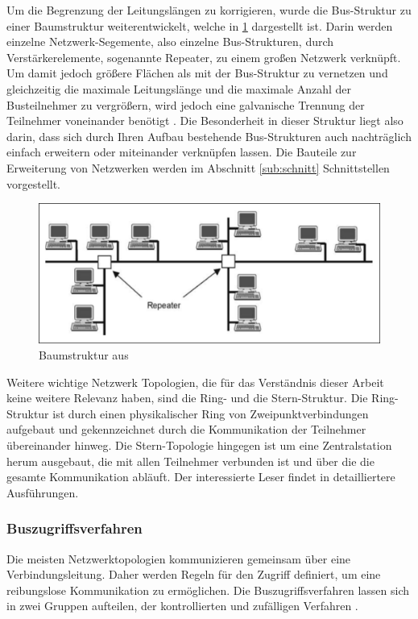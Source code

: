 Um die Begrenzung der Leitungslängen zu korrigieren, wurde die Bus-Struktur zu einer Baumstruktur weiterentwickelt, welche in \ref{fig:baum_struktur} dargestellt ist. Darin werden einzelne Netzwerk-Segemente, also einzelne Bus-Strukturen, durch Verstärkerelemente, sogenannte  Repeater, zu einem großen Netzwerk verknüpft. Um damit jedoch größere Flächen als mit der Bus-Struktur zu vernetzen und gleichzeitig die maximale Leitungslänge und die maximale Anzahl der Busteilnehmer zu vergrößern, wird jedoch eine galvanische Trennung der Teilnehmer voneinander benötigt \cite[S.5~f.]{schn06}. Die Besonderheit in dieser Struktur liegt also darin, dass sich durch Ihren Aufbau bestehende Bus-Strukturen auch nachträglich einfach erweitern oder miteinander verknüpfen lassen. Die Bauteile zur Erweiterung von Netzwerken werden im Abschnitt \ref{sub:schnitt} Schnittstellen vorgestellt.

\begin{figure}
\centering
\includegraphics[width=\textwidth]{abbildungen/20160110_baumstruktur}
\caption[Baumstruktur]{Baumstruktur aus \cite[S.~5]{schn06}}
\label{fig:baum_struktur}
\end{figure}

Weitere wichtige Netzwerk Topologien, die für das Verständnis dieser Arbeit keine weitere Relevanz haben, sind die Ring- und die Stern-Struktur.
Die Ring-Struktur ist durch einen physikalischer Ring von Zweipunktverbindungen aufgebaut und gekennzeichnet durch die Kommunikation der Teilnehmer übereinander hinweg. Die Stern-Topologie hingegen ist um eine Zentralstation herum ausgebaut, die mit allen Teilnehmer verbunden ist und über die die gesamte Kommunikation abläuft. Der interessierte Leser findet in \cite[S.~6f.]{schn06} detailliertere Ausführungen.

\subsubsection{Buszugriffsverfahren}
Die meisten Netzwerktopologien kommunizieren gemeinsam über eine Verbindungsleitung. Daher werden Regeln für den Zugriff definiert, um eine reibungslose Kommunikation zu ermöglichen. Die Buszugriffsverfahren lassen sich in zwei Gruppen aufteilen, der kontrollierten und zufälligen Verfahren \cite[S.~19]{schn06}.

